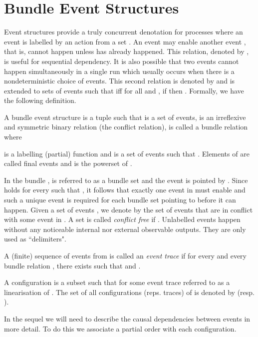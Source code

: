\documentclass{llncs}
\newcommand{\<}{\langle}
\renewcommand{\>}{\rangle}
\begin{document}
\section{Bundle Event Structures}\label{background}

Event structures provide a truly concurrent denotation for processes where an event is labelled by an action from a set . An event  may enable another event , that is,  cannot happen unless  has already happened. This relation, denoted by , is useful for sequential dependency. It is also possible that two events cannot happen simultaneously in a single run which usually occurs when there is a nondeterministic choice of events. This second relation is denoted by  and is extended to sets of events  such that  iff for all  and , if  then . Formally, we have the following definition.
\begin{definition}\label{def:bes}
A bundle event structure  is a tuple  such that  is a set of events,  is an irreflexive and symmetric binary relation (the conflict relation),  is called a bundle relation where 

 is a labelling (partial) function and  is a set of events such that . Elements of  are called final events and  is the powerset of .
\end{definition}

In the bundle ,  is referred to as a bundle set and the event  is pointed by . Since  holds for every  such that , it follows that exactly one event in  must enable  and such a unique event is required for each bundle set pointing to  before it can happen. Given a set of events , we denote by  the set of events that are in conflict with some event in . A set  is called \textit{conflict free} if . Unlabelled events happen without any noticeable internal nor external observable outputs. They are only used as ``delimiters".

A (finite) sequence of events  from  is called an \emph{event trace} if for every  and every bundle relation , there exists  such that  and .

\begin{definition}\label{def:configuration}
A configuration is a subset  such that  for 
some event trace  referred to as a linearisation of . The set of all configurations (reps. traces) of  is denoted by  (resp. ).
\end{definition}

In the sequel we will need to describe the causal dependencies between events in more detail. To do this we associate a partial order with each configuration. 
\end{document}
